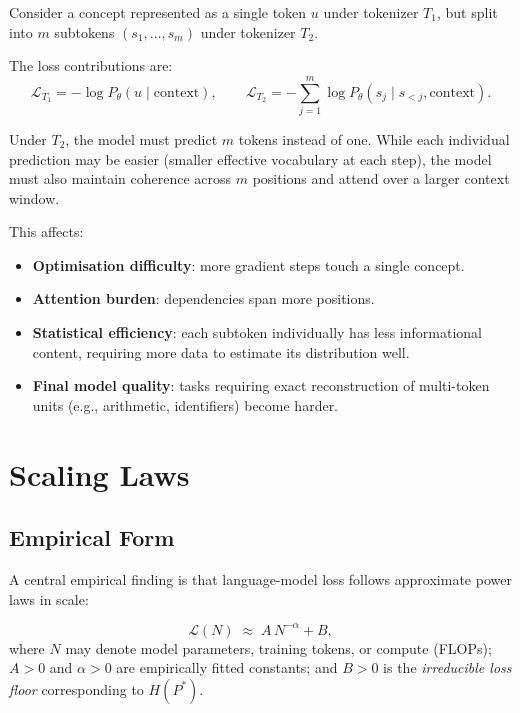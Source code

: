 \documentclass[11pt,a4paper]{article}
\theoremstyle{definition}
\theoremstyle{plain}
\newcommand{\Hc}{H}
\newcommand{\tloss}{\mathcal{L}}
\begin{document}
Consider a concept represented as a single token $u$ under tokenizer $T_1$,
but split into $m$ subtokens $(s_1, \dots, s_m)$ under tokenizer $T_2$.

The loss contributions are:
\[
  \tloss_{T_1} = -\log P_\theta(u \mid \text{context}),
  \qquad
  \tloss_{T_2} = -\sum_{j=1}^{m} \log P_\theta(s_j \mid s_{<j}, \text{context}).
\]

Under $T_2$, the model must predict $m$ tokens instead of one.
While each individual prediction may be easier (smaller effective vocabulary
at each step), the model must also maintain coherence across $m$ positions
and attend over a larger context window.

This affects:
\begin{itemize}[leftmargin=2em, itemsep=2pt]
  \item \textbf{Optimisation difficulty}: more gradient steps touch a single concept.
  \item \textbf{Attention burden}: dependencies span more positions.
  \item \textbf{Statistical efficiency}: each subtoken individually has less
        informational content, requiring more data to estimate its distribution well.
  \item \textbf{Final model quality}: tasks requiring exact reconstruction
        of multi-token units (e.g., arithmetic, identifiers) become harder.
\end{itemize}

\section{Scaling Laws}

\subsection{Empirical Form}

A central empirical finding \cite{kaplan2020scaling, hoffmann2022training} is
that language-model loss follows approximate power laws in scale:

\begin{keyresult}
\[
  \tloss(N) \;\approx\; A\,N^{-\alpha} + B,
\]
where $N$ may denote model parameters, training tokens, or compute (FLOPs);
$A > 0$ and $\alpha > 0$ are empirically fitted constants;
and $B > 0$ is the \emph{irreducible loss floor} corresponding to $\Hc(P^*)$.
\end{keyresult}
\end{document}
